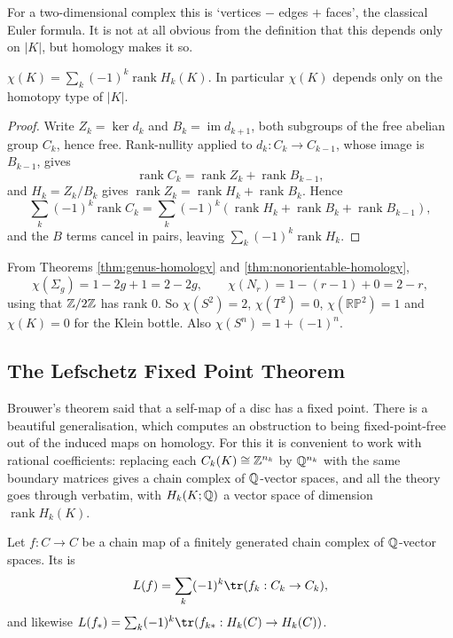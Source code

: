 \documentclass[a4paper]{scrartcl}
\newcommand{\RP}{\mathbb{RP}}
\begin{document}
For a two-dimensional complex this is `vertices $-$ edges $+$ faces', the classical Euler
formula. It is not at all obvious from the definition that this depends only on $|K|$,
but homology makes it so.

\begin{theorem} \label{thm:euler}
	$\displaystyle \chi(K) = \sum_k(-1)^k\operatorname{rank}H_k(K)$. In particular $\chi(K)$ depends only on the homotopy type of $|K|$.
\end{theorem}
\begin{proof}
	Write $Z_k = \ker d_k$ and $B_k = \operatorname{im}d_{k+1}$, both subgroups of the free abelian group $C_k$, hence free. Rank-nullity applied to $d_k: C_k \to C_{k-1}$, whose image is $B_{k-1}$, gives
	$$
	\operatorname{rank}C_k = \operatorname{rank}Z_k + \operatorname{rank}B_{k-1},
	$$
	and $H_k = Z_k/B_k$ gives $\operatorname{rank}Z_k = \operatorname{rank}H_k + \operatorname{rank}B_k$. Hence
	$$
	\sum_k(-1)^k\operatorname{rank}C_k = \sum_k(-1)^k(\operatorname{rank}H_k + \operatorname{rank}B_k + \operatorname{rank}B_{k-1}),
	$$
	and the $B$ terms cancel in pairs, leaving $\sum_k(-1)^k\operatorname{rank}H_k$.
\end{proof}

\begin{example}
	From Theorems \ref{thm:genus-homology} and \ref{thm:nonorientable-homology},
	$$
	\chi(\Sigma_g) = 1 - 2g + 1 = 2-2g, \qquad \chi(N_r) = 1 - (r-1) + 0 = 2 - r,
	$$
	using that $\mathbb{Z}/2\mathbb{Z}$ has rank $0$. So $\chi(S^2) = 2$, $\chi(T^2) = 0$, $\chi(\RP^2) = 1$ and $\chi(K) = 0$ for the Klein bottle. Also $\chi(S^n) = 1+(-1)^n$.
\end{example}

\subsection{The Lefschetz Fixed Point Theorem}

Brouwer's theorem said that a self-map of a disc has a fixed point. There is a beautiful
generalisation, which computes an obstruction to being fixed-point-free out of the
induced maps on homology. For this it is convenient to work with rational coefficients:
replacing each $C_k(K) \cong \mathbb{Z}^{n_k}$ by $\mathbb{Q}^{n_k}$ with the same boundary matrices gives
a chain complex of $\mathbb{Q}$-vector spaces, and all the theory goes through verbatim, with
$H_k(K;\mathbb{Q})$ a vector space of dimension $\operatorname{rank}H_k(K)$.

\begin{definition}
	Let $f: C \to C$ be a chain map of a finitely generated chain complex of $\mathbb{Q}$-vector spaces. Its  is
	$$
	L(f) = \sum_k (-1)^k \tr(f_k: C_k \to C_k),
	$$
	and likewise $L(f_*) = \sum_k(-1)^k\tr(f_{k*}: H_k(C)\to H_k(C))$.
\end{definition}
\end{document}
